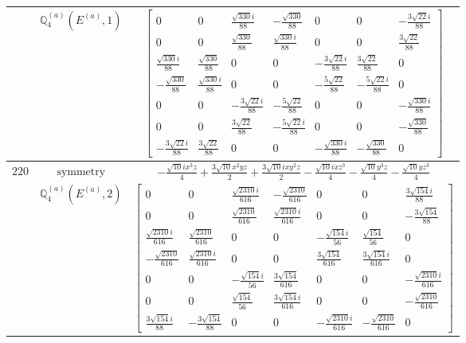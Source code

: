 \documentclass[fleqn,8pt,landscape]{jsarticle}
\begin{document}
\begin{longtable}{ccc}
$  $ & $ \mathbb{Q}_{4}^{(a)}(E^{(a)},1) $ & $ \begin{bmatrix} 0 & 0 & \frac{\sqrt{330} i}{88} & - \frac{\sqrt{330}}{88} & 0 & 0 & - \frac{3 \sqrt{22} i}{88} \\ 0 & 0 & \frac{\sqrt{330}}{88} & \frac{\sqrt{330} i}{88} & 0 & 0 & \frac{3 \sqrt{22}}{88} \\ \frac{\sqrt{330} i}{88} & \frac{\sqrt{330}}{88} & 0 & 0 & - \frac{3 \sqrt{22} i}{88} & \frac{3 \sqrt{22}}{88} & 0 \\ - \frac{\sqrt{330}}{88} & \frac{\sqrt{330} i}{88} & 0 & 0 & - \frac{5 \sqrt{22}}{88} & - \frac{5 \sqrt{22} i}{88} & 0 \\ 0 & 0 & - \frac{3 \sqrt{22} i}{88} & - \frac{5 \sqrt{22}}{88} & 0 & 0 & - \frac{\sqrt{330} i}{88} \\ 0 & 0 & \frac{3 \sqrt{22}}{88} & - \frac{5 \sqrt{22} i}{88} & 0 & 0 & - \frac{\sqrt{330}}{88} \\ - \frac{3 \sqrt{22} i}{88} & \frac{3 \sqrt{22}}{88} & 0 & 0 & - \frac{\sqrt{330} i}{88} & - \frac{\sqrt{330}}{88} & 0 \end{bmatrix} $ \\ \hline
$ 220 $ & $ \text{symmetry} $ & $ - \frac{\sqrt{10} i x^{3} z}{4} + \frac{3 \sqrt{10} x^{2} y z}{2} + \frac{3 \sqrt{10} i x y^{2} z}{2} - \frac{\sqrt{10} i x z^{3}}{4} - \frac{\sqrt{10} y^{3} z}{4} - \frac{\sqrt{10} y z^{3}}{4} $ \\
$  $ & $ \mathbb{Q}_{4}^{(a)}(E^{(a)},2) $ & $ \begin{bmatrix} 0 & 0 & \frac{\sqrt{2310} i}{616} & - \frac{\sqrt{2310}}{616} & 0 & 0 & \frac{3 \sqrt{154} i}{88} \\ 0 & 0 & \frac{\sqrt{2310}}{616} & \frac{\sqrt{2310} i}{616} & 0 & 0 & - \frac{3 \sqrt{154}}{88} \\ \frac{\sqrt{2310} i}{616} & \frac{\sqrt{2310}}{616} & 0 & 0 & - \frac{\sqrt{154} i}{56} & \frac{\sqrt{154}}{56} & 0 \\ - \frac{\sqrt{2310}}{616} & \frac{\sqrt{2310} i}{616} & 0 & 0 & \frac{3 \sqrt{154}}{616} & \frac{3 \sqrt{154} i}{616} & 0 \\ 0 & 0 & - \frac{\sqrt{154} i}{56} & \frac{3 \sqrt{154}}{616} & 0 & 0 & - \frac{\sqrt{2310} i}{616} \\ 0 & 0 & \frac{\sqrt{154}}{56} & \frac{3 \sqrt{154} i}{616} & 0 & 0 & - \frac{\sqrt{2310}}{616} \\ \frac{3 \sqrt{154} i}{88} & - \frac{3 \sqrt{154}}{88} & 0 & 0 & - \frac{\sqrt{2310} i}{616} & - \frac{\sqrt{2310}}{616} & 0 \end{bmatrix} $ \\ \hline

\end{longtable}
\end{document}
